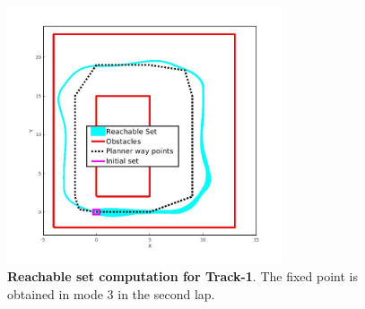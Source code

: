 

\begin{figure}
    \centering
    \includegraphics[width=3.2in]{Figures/tracks/track1-voronoi-cora.jpg}
\caption{\textbf{Reachable set computation for Track-1}. The fixed point is obtained in mode 3 in the second lap.}
\label{fig:track1_voronoi-cora}
\end{figure}


